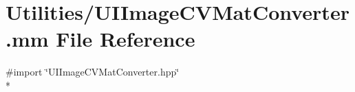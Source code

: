 \hypertarget{_u_i_image_c_v_mat_converter_8mm}{\section{Utilities/\+U\+I\+Image\+C\+V\+Mat\+Converter.mm File Reference}
\label{_u_i_image_c_v_mat_converter_8mm}
}
{\ttfamily \#import \char`\"{}U\+I\+Image\+C\+V\+Mat\+Converter.\+hpp\char`\"{}}\\*

